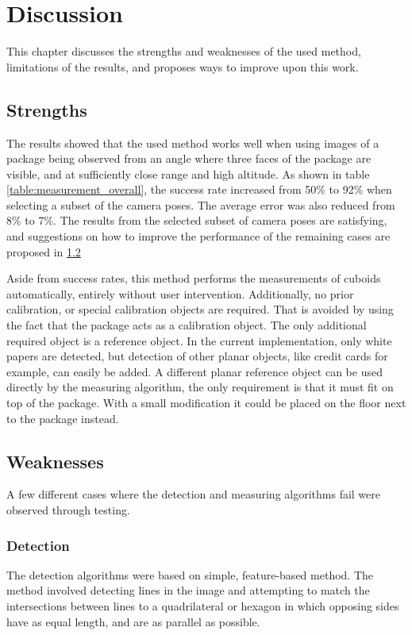 \chapter{Discussion}
This chapter discusses the strengths and weaknesses of the used method, limitations of the results, and proposes ways to improve upon this work.

\section{Strengths}
The results showed that the used method works well when using images of a package being observed from an angle where three faces of the package are visible, and at sufficiently close range and high altitude. 
As shown in table \ref{table:measurement_overall}, the success rate increased from 50\% to 92\% when selecting a subset of the camera poses.
The average error was also reduced from 8\% to 7\%.
The results from the selected subset of camera poses are satisfying, and suggestions on how to improve the performance of the remaining cases are proposed in \ref{discussion:weaknesses}

Aside from success rates, this method performs the measurements of cuboids automatically, entirely without user intervention.
Additionally, no prior calibration, or special calibration objects are required.
That is avoided by using the fact that the package acts as a calibration object.
The only additional required object is a reference object.
In the current implementation, only white papers are detected, but detection of other planar objects, like credit cards for example, can easily be added.
A different planar reference object can be used directly by the measuring algorithm, the only requirement is that it must fit on top of the package.
With a small modification it could be placed on the floor next to the package instead.


\section{Weaknesses} \label{discussion:weaknesses}
A few different cases where the detection and measuring algorithms fail were observed through testing.

\subsection{Detection}
The detection algorithms were based on simple, feature-based method. 
The method involved detecting lines in the image and attempting to match the intersections between lines to a quadrilateral or hexagon in which opposing sides have as equal length, and are as parallel as possible.

